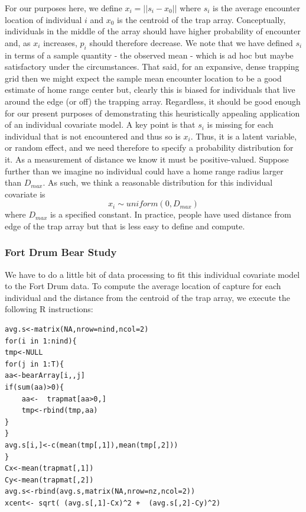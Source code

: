 For our purposes here, we define $x_{i} = ||s_{i} - x_{0}||$ where $s_{i}$
is the average encounter location of individual $i$ and $x_{0}$ is the
centroid of the trap array.  Conceptually, individuals in the middle
of the array should have higher probability of encounter and, as
$x_{i}$ increases, $p_{i}$ should therefore decrease. We note that we
have defined $s_{i}$ in terms of a sample quantity - the observed mean
- which is ad hoc but maybe satisfactory under the circumstances. That
said, for
an expansive, dense trapping grid then we might expect the sample mean
encounter location to be a good estimate of home range center but,
clearly this is biased for individuals that live around the edge (or
off) the trapping array. Regardless, it should be good enough for our
present purposes of demonstrating this heuristically appealing
application of an individual covariate model. A key point is that
$s_{i}$ is missing for each individual that is not encountered and
thus so is $x_{i}$. Thus,
it is a latent variable, or random effect, and we need therefore to
specify a probability distribution for it.  
As a measurement of distance we know it must be
positive-valued. Suppose further than we imagine no individual could
have a home range radius larger than $D_{max}$. As such, we think a
reasonable distribution for this individual covariate is
\[
 x_{i} \sim uniform(0,D_{max})
\]
where $D_{max}$ is a specified constant.  In practice, people have
used distance from edge of the trap array but that is less easy to
define and compute.


\subsubsection{Fort Drum Bear Study} 

We have to do a little bit of data processing to fit this individual
covariate model to the Fort Drum data. To compute the average location
of capture for each individual and the distance from the centroid of
the trap array, we execute the following R instructions:

\begin{verbatim}
avg.s<-matrix(NA,nrow=nind,ncol=2)
for(i in 1:nind){
tmp<-NULL
for(j in 1:T){
aa<-bearArray[i,,j]
if(sum(aa)>0){
 	aa<-  trapmat[aa>0,]
 	tmp<-rbind(tmp,aa)
}
}
avg.s[i,]<-c(mean(tmp[,1]),mean(tmp[,2]))
}
Cx<-mean(trapmat[,1])
Cy<-mean(trapmat[,2])
avg.s<-rbind(avg.s,matrix(NA,nrow=nz,ncol=2))
xcent<- sqrt( (avg.s[,1]-Cx)^2 +  (avg.s[,2]-Cy)^2)
\end{verbatim}

